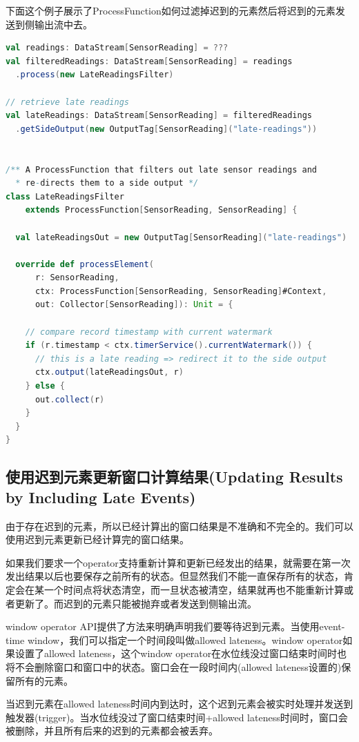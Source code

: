 \documentclass[oneside]{ctexbook}
\begin{document}
下面这个例子展示了ProcessFunction如何过滤掉迟到的元素然后将迟到的元素发送到侧输出流中去。

\begin{lstlisting}[language=scala]
val readings: DataStream[SensorReading] = ???
val filteredReadings: DataStream[SensorReading] = readings
  .process(new LateReadingsFilter)

// retrieve late readings
val lateReadings: DataStream[SensorReading] = filteredReadings
  .getSideOutput(new OutputTag[SensorReading]("late-readings"))


/** A ProcessFunction that filters out late sensor readings and 
  * re-directs them to a side output */
class LateReadingsFilter 
    extends ProcessFunction[SensorReading, SensorReading] {

  val lateReadingsOut = new OutputTag[SensorReading]("late-readings")

  override def processElement(
      r: SensorReading,
      ctx: ProcessFunction[SensorReading, SensorReading]#Context,
      out: Collector[SensorReading]): Unit = {

    // compare record timestamp with current watermark
    if (r.timestamp < ctx.timerService().currentWatermark()) {
      // this is a late reading => redirect it to the side output
      ctx.output(lateReadingsOut, r)
    } else {
      out.collect(r)
    }
  }
}
\end{lstlisting}

\subsection{使用迟到元素更新窗口计算结果(Updating Results by Including Late Events)}

由于存在迟到的元素，所以已经计算出的窗口结果是不准确和不完全的。我们可以使用迟到元素更新已经计算完的窗口结果。

如果我们要求一个operator支持重新计算和更新已经发出的结果，就需要在第一次发出结果以后也要保存之前所有的状态。但显然我们不能一直保存所有的状态，肯定会在某一个时间点将状态清空，而一旦状态被清空，结果就再也不能重新计算或者更新了。而迟到的元素只能被抛弃或者发送到侧输出流。

window operator API提供了方法来明确声明我们要等待迟到元素。当使用event-time window，我们可以指定一个时间段叫做allowed lateness。window operator如果设置了allowed lateness，这个window operator在水位线没过窗口结束时间时也将不会删除窗口和窗口中的状态。窗口会在一段时间内(allowed lateness设置的)保留所有的元素。

当迟到元素在allowed lateness时间内到达时，这个迟到元素会被实时处理并发送到触发器(trigger)。当水位线没过了窗口结束时间+allowed lateness时间时，窗口会被删除，并且所有后来的迟到的元素都会被丢弃。
\end{document}
